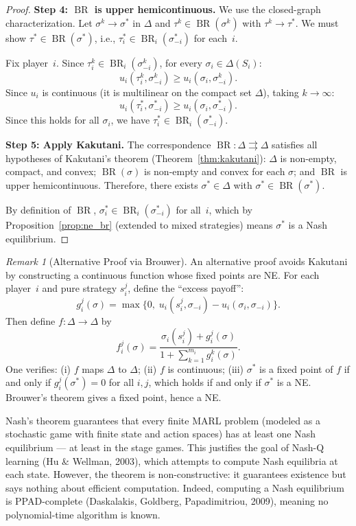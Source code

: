\documentclass[11pt,a4paper]{article}
\theoremstyle{definition}
\theoremstyle{plain}
\theoremstyle{remark}
\newtheorem{remark}{Remark}[section]
\DeclareMathOperator{\BR}{BR}
\begin{document}
\begin{proof}
\textbf{Step 4: $\BR$ is upper hemicontinuous.}
We use the closed-graph characterization. Let $\sigma^k \to \sigma^*$ in $\Delta$
and $\tau^k \in \BR(\sigma^k)$ with $\tau^k \to \tau^*$. We must show
$\tau^* \in \BR(\sigma^*)$, i.e., $\tau_i^* \in \BR_i(\sigma_{-i}^*)$ for each~$i$.

Fix player~$i$. Since $\tau_i^k \in \BR_i(\sigma_{-i}^k)$, for every
$\sigma_i \in \Delta(S_i)$:
\[
    u_i(\tau_i^k, \sigma_{-i}^k) \geq u_i(\sigma_i, \sigma_{-i}^k).
\]
Since $u_i$ is continuous (it is multilinear on the compact set $\Delta$), taking
$k \to \infty$:
\[
    u_i(\tau_i^*, \sigma_{-i}^*) \geq u_i(\sigma_i, \sigma_{-i}^*).
\]
Since this holds for all $\sigma_i$, we have $\tau_i^* \in \BR_i(\sigma_{-i}^*)$.

\textbf{Step 5: Apply Kakutani.}
The correspondence $\BR : \Delta \rightrightarrows \Delta$ satisfies all hypotheses of
Kakutani's theorem (Theorem~\ref{thm:kakutani}): $\Delta$ is non-empty, compact, and
convex; $\BR(\sigma)$ is non-empty and convex for each $\sigma$; and $\BR$ is upper
hemicontinuous. Therefore, there exists $\sigma^* \in \Delta$ with
$\sigma^* \in \BR(\sigma^*)$.

By definition of $\BR$, $\sigma_i^* \in \BR_i(\sigma_{-i}^*)$ for all~$i$,
which by Proposition~\ref{prop:ne_br} (extended to mixed strategies) means $\sigma^*$
is a Nash equilibrium.
\end{proof}

\begin{remark}[Alternative Proof via Brouwer]
\label{rem:brouwer_proof}
An alternative proof avoids Kakutani by constructing a continuous function whose
fixed points are NE. For each player~$i$ and pure strategy $s_i^j$, define the
``excess payoff'':
\[
    g_i^j(\sigma) = \max\big\{0,\; u_i(s_i^j, \sigma_{-i}) - u_i(\sigma_i, \sigma_{-i})\big\}.
\]
Then define $f : \Delta \to \Delta$ by
\[
    f_i^j(\sigma) = \frac{\sigma_i(s_i^j) + g_i^j(\sigma)}
    {1 + \sum_{k=1}^{m_i} g_i^k(\sigma)}.
\]
One verifies: (i) $f$ maps $\Delta$ to $\Delta$; (ii) $f$ is continuous; (iii)
$\sigma^*$ is a fixed point of $f$ if and only if $g_i^j(\sigma^*) = 0$ for all
$i, j$, which holds if and only if $\sigma^*$ is a NE. Brouwer's theorem gives a
fixed point, hence a NE.
\end{remark}

\begin{rlconnection}
Nash's theorem guarantees that every finite MARL problem (modeled as a stochastic game
with finite state and action spaces) has at least one Nash equilibrium --- at least in
the stage games. This justifies the goal of Nash-Q learning (Hu \& Wellman, 2003),
which attempts to compute Nash equilibria at each state. However, the theorem is
non-constructive: it guarantees existence but says nothing about efficient computation.
Indeed, computing a Nash equilibrium is PPAD-complete (Daskalakis, Goldberg, Papadimitriou,
2009), meaning no polynomial-time algorithm is known.
\end{rlconnection}
\end{document}
